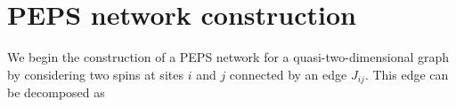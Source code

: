 



\section{PEPS network construction}
We begin the construction of a PEPS network for a quasi-two-dimensional graph by
considering two spins at sites $i$ and $j$ connected by an edge $J_{ij}$. This
edge can be decomposed as

